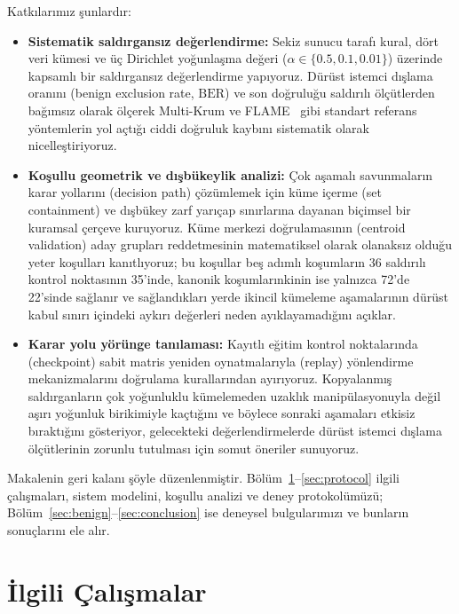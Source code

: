 \documentclass[journal]{IEEEtran}
\newcommand{\BER}{\mathrm{BER}}
\begin{document}
Katkılarımız şunlardır:
\begin{itemize}
    \item \textbf{Sistematik saldırgansız değerlendirme:} Sekiz sunucu tarafı kural, dört veri kümesi ve üç Dirichlet yoğunlaşma değeri ($\alpha\in\{0.5,0.1,0.01\}$) üzerinde kapsamlı bir saldırgansız değerlendirme yapıyoruz. Dürüst istemci dışlama oranını (benign exclusion rate, $\BER$) ve son doğruluğu saldırılı ölçütlerden bağımsız olarak ölçerek Multi-Krum ve FLAME~\cite{nguyen2022flame} gibi standart referans yöntemlerin yol açtığı ciddi doğruluk kaybını sistematik olarak nicelleştiriyoruz.
    \item \textbf{Koşullu geometrik ve dışbükeylik analizi:} Çok aşamalı savunmaların karar yollarını (decision path) çözümlemek için küme içerme (set containment) ve dışbükey zarf yarıçap sınırlarına dayanan biçimsel bir kuramsal çerçeve kuruyoruz. Küme merkezi doğrulamasının (centroid validation) aday grupları reddetmesinin matematiksel olarak olanaksız olduğu yeter koşulları kanıtlıyoruz; bu koşullar beş adımlı koşumların 36 saldırılı kontrol noktasının 35'inde, kanonik koşumlarınkinin ise yalnızca 72'de 22'sinde sağlanır ve sağlandıkları yerde ikincil kümeleme aşamalarının dürüst kabul sınırı içindeki aykırı değerleri neden ayıklayamadığını açıklar.
    \item \textbf{Karar yolu yörünge tanılaması:} Kayıtlı eğitim kontrol noktalarında (checkpoint) sabit matris yeniden oynatmalarıyla (replay) yönlendirme mekanizmalarını doğrulama kurallarından ayırıyoruz. Kopyalanmış saldırganların çok yoğunluklu kümelemeden uzaklık manipülasyonuyla değil aşırı yoğunluk birikimiyle kaçtığını ve böylece sonraki aşamaları etkisiz bıraktığını gösteriyor, gelecekteki değerlendirmelerde dürüst istemci dışlama ölçütlerinin zorunlu tutulması için somut öneriler sunuyoruz.
\end{itemize}

Makalenin geri kalanı şöyle düzenlenmiştir. Bölüm~\ref{sec:related}--\ref{sec:protocol} ilgili çalışmaları, sistem modelini, koşullu analizi ve deney protokolümüzü; Bölüm~\ref{sec:benign}--\ref{sec:conclusion} ise deneysel bulgularımızı ve bunların sonuçlarını ele alır.

\section{İlgili Çalışmalar}\label{sec:related}
\end{document}
